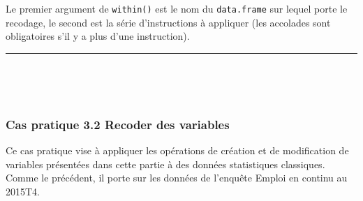 \documentclass[12pt,twosided, notitlepage]{book}
\begin{document}
Le premier argument de \texttt{within()} est le nom du
\texttt{data.frame} sur lequel porte le recodage, le second est la série
d'instructions à appliquer (les accolades sont obligatoires s'il y a
plus d'une instruction).

\begin{center}\rule{0.5\linewidth}{\linethickness}\end{center}

~

~

\hypertarget{cas-pratique-3.2-recoder-des-variables}{%
\subsubsection{\texorpdfstring{\textbf{Cas pratique 3.2} Recoder des
variables}{Cas pratique 3.2 Recoder des variables}}\label{cas-pratique-3.2-recoder-des-variables}}


Ce cas pratique vise à appliquer les opérations de création et de
modification de variables présentées dans cette partie à des données
statistiques classiques. Comme le précédent, il porte sur les données de
l'enquête Emploi en continu au 2015T4.
\end{document}
